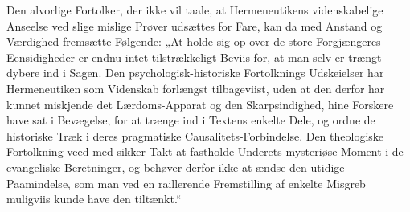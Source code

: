 \documentclass[12pt,a4paper]{book}
\begin{document}
Den alvorlige Fortolker, der ikke vil taale, at Hermeneutikens videnskabelige Anseelse ved
slige mislige Prøver udsættes for Fare, kan da med Anstand og Værdighed fremsætte Følgende:
„At holde sig op over de store Forgjængeres Eensidigheder er endnu intet tilstrækkeligt
Beviis for, at man selv er trængt dybere ind i Sagen. Den psychologisk-historiske
Fortolknings Udskeielser har Hermeneutiken som Videnskab forlængst tilbageviist, uden at den
derfor har kunnet miskjende det Lærdoms-Apparat og den Skarpsindighed, hine Forskere have sat
i Bevægelse, for at trænge ind i Textens enkelte Dele, og ordne de historiske Træk i deres
pragmatiske Causalitets-Forbindelse. Den theologiske Fortolkning veed med sikker Takt at
fastholde Underets mysteriøse Moment i de evangeliske Beretninger, og behøver derfor ikke at
ændse den utidige Paamindelse, som man ved en raillerende Fremstilling af enkelte Misgreb
muligviis kunde have den tiltænkt.“
\end{document}
